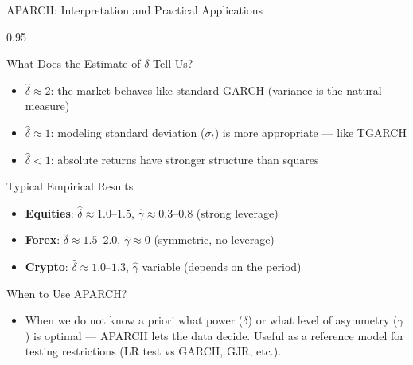 \documentclass[9pt, aspectratio=169, t]{beamer}
\begin{document}
\begin{frame}{APARCH: Interpretation and Practical Applications}
    \begin{cminipage}{0.95\textwidth}
    \vspace{-0.2cm}
    {\scriptsize
        \begin{block}{What Does the Estimate of $\delta$ Tell Us?}
            \begin{itemize}\setlength{\itemsep}{0pt}
                \item $\hat{\delta} \approx 2$: the market behaves like standard GARCH (variance is the natural measure)
                \item $\hat{\delta} \approx 1$: modeling standard deviation ($\sigma_t$) is more appropriate --- like TGARCH
                \item $\hat{\delta} < 1$: absolute returns have stronger structure than squares
            \end{itemize}
        \end{block}
        \begin{exampleblock}{Typical Empirical Results}
            \begin{itemize}\setlength{\itemsep}{0pt}
                \item \textbf{Equities}: $\hat{\delta} \approx 1.0$--$1.5$, $\hat{\gamma} \approx 0.3$--$0.8$ (strong leverage)
                \item \textbf{Forex}: $\hat{\delta} \approx 1.5$--$2.0$, $\hat{\gamma} \approx 0$ (symmetric, no leverage)
                \item \textbf{Crypto}: $\hat{\delta} \approx 1.0$--$1.3$, $\hat{\gamma}$ variable (depends on the period)
            \end{itemize}
        \end{exampleblock}
        \begin{alertblock}{When to Use APARCH?}
            \begin{itemize}\setlength{\itemsep}{0pt}
                \item When we do not know a priori what power ($\delta$) or what level of asymmetry ($\gamma$) is optimal --- APARCH lets the data decide. Useful as a reference model for testing restrictions (LR test vs GARCH, GJR, etc.).
            \end{itemize}
        \end{alertblock}
    }
    \end{cminipage}
\end{frame}
\end{document}
